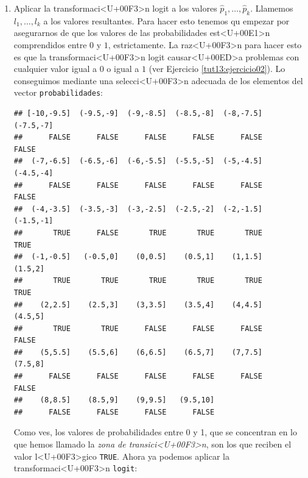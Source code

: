 \documentclass[10pt,a4paper]{article}
\begin{document}
\begin{enumerate}
  \item Aplicar la transformaci<U+00F3>n logit a los valores $\hat p_1,\ldots,\hat p_k$. Llamemos $l_1,\ldots,l_k$ a los valores resultantes. Para hacer esto tenemos qu empezar por asegurarnos de que los valores de las probabilidades est<U+00E1>n comprendidos entre $0$ y $1$, estrictamente. La raz<U+00F3>n para hacer esto es que la transformaci<U+00F3>n logit causar<U+00ED>a problemas con cualquier valor igual a $0$ o igual a $1$ (ver Ejercicio \ref{tut13:ejercicio02}). Lo conseguimos mediante una selecci<U+00F3>n adecuada  de los elementos del vector {\tt probabilidades}:

\begin{knitrout}
\color{fgcolor}\begin{kframe}
\begin{alltt}
 \hlkwb{=}  \hlopt{<} \hlstd{)} \hlopt{&}  \hlopt{>} \hlstd{))}
\end{alltt}
\begin{verbatim}
## [-10,-9.5]  (-9.5,-9]  (-9,-8.5]  (-8.5,-8]  (-8,-7.5]  (-7.5,-7] 
##      FALSE      FALSE      FALSE      FALSE      FALSE      FALSE 
##  (-7,-6.5]  (-6.5,-6]  (-6,-5.5]  (-5.5,-5]  (-5,-4.5]  (-4.5,-4] 
##      FALSE      FALSE      FALSE      FALSE      FALSE      FALSE 
##  (-4,-3.5]  (-3.5,-3]  (-3,-2.5]  (-2.5,-2]  (-2,-1.5]  (-1.5,-1] 
##       TRUE      FALSE       TRUE       TRUE       TRUE       TRUE 
##  (-1,-0.5]   (-0.5,0]    (0,0.5]    (0.5,1]    (1,1.5]    (1.5,2] 
##       TRUE       TRUE       TRUE       TRUE       TRUE       TRUE 
##    (2,2.5]    (2.5,3]    (3,3.5]    (3.5,4]    (4,4.5]    (4.5,5] 
##       TRUE       TRUE      FALSE      FALSE      FALSE      FALSE 
##    (5,5.5]    (5.5,6]    (6,6.5]    (6.5,7]    (7,7.5]    (7.5,8] 
##      FALSE      FALSE      FALSE      FALSE      FALSE      FALSE 
##    (8,8.5]    (8.5,9]    (9,9.5]   (9.5,10] 
##      FALSE      FALSE      FALSE      FALSE
\end{verbatim}
\end{kframe}
\end{knitrout}
Como ves, los valores de probabilidades entre 0 y 1, que se concentran en lo que hemos llamado la {\em zona de transici<U+00F3>n}, son los que reciben el valor l<U+00F3>gico {\tt TRUE}. Ahora ya podemos aplicar la transformaci<U+00F3>n {\tt logit}:

\begin{knitrout}
\color{fgcolor}\begin{kframe}
\begin{alltt}
 \hlkwb{=} \hlopt{/}\hlstd{(}\hlopt{-}
\end{alltt}
\end{kframe}
\end{knitrout}


\end{enumerate}
\end{document}
